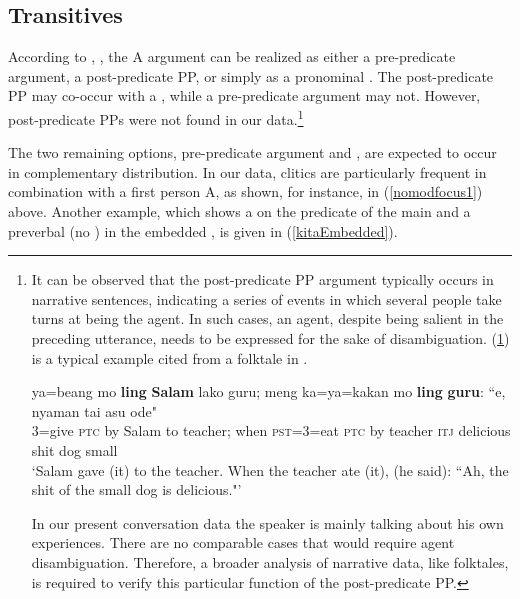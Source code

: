 \documentclass[output=paper
,modfonts
,nonflat]{langsci/langscibook}
\begin{document}
\subsection{Transitives}

According to , , the A argument can be realized as either a pre-predicate argument, a post-predicate PP, or simply as a pronominal . The post-predicate PP may co-occur with a , while a pre-predicate argument may not. However, post-predicate PPs were not found in our data.\footnote{It can be observed that the post-predicate PP argument typically occurs in narrative sentences, indicating a series of events in which several people take turns at being the  agent. In such cases, an agent, despite being salient in the preceding utterance, needs to be expressed for the sake of disambiguation. (\ref{dogPoop}) is a typical example cited from a folktale in \cite[][214]{jonjc34}.
	
	\begin{exe}
		\ex\label{dogPoop}
		\gll ya=beang mo \textbf{ling} \textbf{Salam} lako guru; meng ka=ya=kakan mo \textbf{ling} \textbf{guru}: \hspace{3em} {``e,} nyaman tai asu {ode"}\\
		3=give \textsc{ptc} by Salam to teacher; when \textsc{pst}=3=eat \textsc{ptc} by teacher {} \textsc{itj} delicious shit dog small\\
		\glt `Salam gave (it) to the teacher. When the teacher ate (it), (he said): ``Ah, the shit of the small dog is delicious."'
	\end{exe}
	
	\noindent In our present conversation data the speaker is mainly talking about his own experiences. There are no comparable cases that would require agent disambiguation. Therefore, a broader ana\-ly\-sis of narrative data, like folktales, is required to verify this particular function of the post-predicate PP.}

The two remaining options, pre-predicate argument and , are expected to occur in complementary distribution. In our data, clitics are particularly frequent in combination with a first person A, as shown, for instance, in (\ref{nomodfocus1}) above. Another example, which shows a  on the predicate of the main  and a preverbal  (no ) in the embedded , is given in (\ref{kitaEmbedded}).
\end{document}
